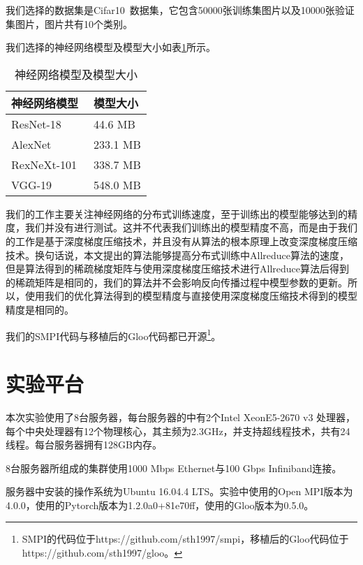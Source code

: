 我们选择的数据集是Cifar10~\cite{krizhevsky2009learning}数据集，它包含50000张训练集图片以及10000张验证集图片，图片共有10个类别。

我们选择的神经网络模型及模型大小如表\ref{tab:models}所示。

\begin{table}[htb]
    \centering
    \caption{神经网络模型及模型大小}
    \label{tab:models}
    \begin{tabularx}{\linewidth}{  p{7cm}<{\centering}   p{7cm}<{\centering}}
        \toprule[1.5pt]
        {神经网络模型} & {模型大小}\\\midrule[1pt]
        ResNet-18~\cite{he2016deep} & 44.6 MB \\
        AlexNet~\cite{krizhevsky2014one} & 233.1 MB \\
        RexNeXt-101~\cite{xie2017aggregated} & 338.7 MB \\
        VGG-19~\cite{simonyan2014very} & 548.0 MB \\
        \bottomrule[1.5pt]
    \end{tabularx}
\end{table}

我们的工作主要关注神经网络的分布式训练速度，至于训练出的模型能够达到的精度，我们并没有进行测试。这并不代表我们训练出的模型精度不高，而是由于我们的工作是基于深度梯度压缩技术，并且没有从算法的根本原理上改变深度梯度压缩技术。换句话说，本文提出的算法能够提高分布式训练中Allreduce算法的速度，但是算法得到的稀疏梯度矩阵与使用深度梯度压缩技术进行Allreduce算法后得到的稀疏矩阵是相同的，我们的算法并不会影响反向传播过程中模型参数的更新。所以，使用我们的优化算法得到的模型精度与直接使用深度梯度压缩技术得到的模型精度是相同的。

我们的SMPI代码与移植后的Gloo代码都已开源\footnote{SMPI的代码位于https://github.com/sth1997/smpi，移植后的Gloo代码位于https://github.com/sth1997/gloo。}。

\section{实验平台}
本次实验使用了8台服务器，每台服务器的中有2个Intel XeonE5-2670 v3 处理器，每个中央处理器有12个物理核心，其主频为2.3GHz，并支持超线程技术，共有24线程。每台服务器拥有128GB内存。

8台服务器所组成的集群使用1000 Mbps Ethernet与100 Gbps Infiniband连接。

服务器中安装的操作系统为Ubuntu 16.04.4 LTS。实验中使用的Open MPI版本为4.0.0，使用的Pytorch版本为1.2.0a0+81e70ff，使用的Gloo版本为0.5.0。

